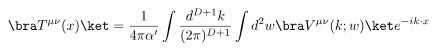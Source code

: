 \begin{equation}
\bra T^{\mu\nu}(x) \ket = \frac{1}{4\pi \alpha'}
\int \frac{d^{D+1}k}{(2\pi)^{D+1}}\int d^2w
\bra V^{\mu\nu}(k;w) \ket e^{-ik\cdot x}
\end{equation}

